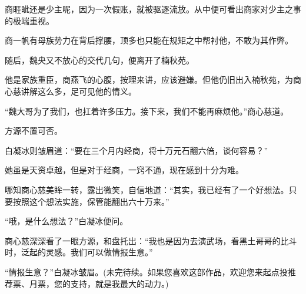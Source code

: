 \begin{this_body}
商睚眦还是少主呢，因为一次假账，就被驱逐流放。从中便可看出商家对少主之事的极端重视。

商一帆有母族势力在背后撑腰，顶多也只能在规矩之中帮衬他，不敢为其作弊。

随后，魏央又不放心的交代几句，便离开了楠秋苑。

他是家族重臣，商燕飞的心腹，按理来讲，应该避嫌。但他仍旧出入楠秋苑，为商心慈讲解这么多，足可见他的情义。

“魏大哥为了我们，也扛着许多压力。接下来，我们不能再麻烦他。”商心慈道。

方源不置可否。

白凝冰则皱眉道：“要在三个月内经商，将十万元石翻六倍，谈何容易？”

她虽是天资卓越，但是对于经商，一窍不通，现在感到十分为难。

哪知商心慈美眸一转，露出微笑，自信地道：“其实，我已经有了一个好想法。只要按照这个想法实施，保管能翻出六十万来。”

“哦，是什么想法？”白凝冰便问。

商心慈深深看了一眼方源，和盘托出：“我也是因为去演武场，看黑土哥哥的比斗时，泛起的灵感。我们可以做情报生意。”

“情报生意？”白凝冰皱眉。(未完待续。如果您喜欢这部作品，欢迎您来起点投推荐票、月票，您的支持，就是我最大的动力。)

\end{this_body}

